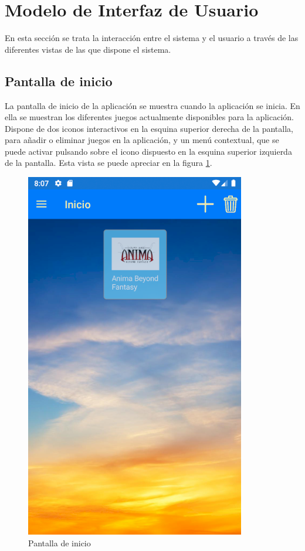 
\section{Modelo de Interfaz de Usuario}
En esta sección se trata la interacción entre el sistema y el usuario a través de las diferentes vistas 
de las que dispone el sistema.

\subsection{Pantalla de inicio}
La pantalla de inicio de la aplicación se muestra cuando la aplicación se inicia. En ella se 
muestran los diferentes juegos actualmente disponibles para la aplicación.
Dispone de dos iconos interactivos en la esquina superior derecha de la pantalla, para añadir o eliminar 
juegos en la aplicación, y un menú contextual, que se puede activar pulsando sobre el icono dispuesto 
en la esquina superior izquierda de la pantalla. Esta vista se puede apreciar en la figura \ref*{PantallaInicio}.
\newpage

\begin{figure}[H]
    \centering
    \includegraphics[scale=0.3]{Figures/Capturas/PantallaInicio.png}
    \caption{Pantalla de inicio}
    \label{PantallaInicio}    
\end{figure}

